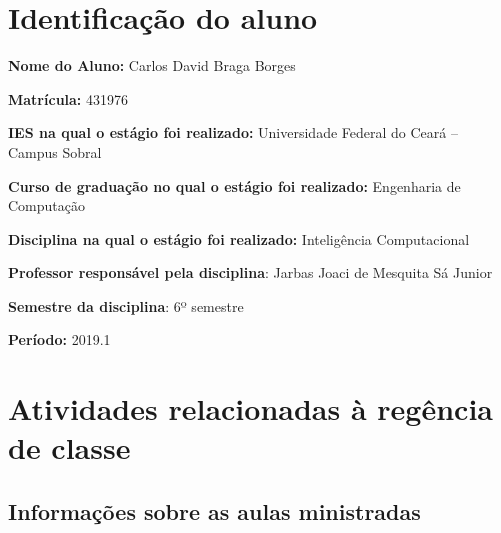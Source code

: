 \documentclass[
	12pt,				%
	openright,			%
	oneside,			%
	a4paper,			%
	chapter=TITLE,		%
	section=TITLE,		%
	english,			%
	french,				%
	spanish,			%
	brazil				%
	]{abntex2}
\begin{document}
\tableofcontents

\pagestyle{plain}

\chapter{Identificação do aluno}

\textbf{Nome do Aluno:} Carlos David Braga Borges

\textbf{Matrícula:} 431976

\textbf{IES na qual o estágio foi realizado:} Universidade Federal do Ceará -- Campus Sobral

\textbf{Curso de graduação no qual o estágio foi realizado:} Engenharia de Computação

\textbf{Disciplina na qual o estágio foi realizado:} Inteligência Computacional

\textbf{Professor responsável pela disciplina}: Jarbas Joaci de Mesquita Sá Junior

\textbf{Semestre da disciplina}: 6º semestre

\textbf{Período:} 2019.1


\newpage

\chapter{Atividades relacionadas à regência de classe}

\vspace{-1cm}

\section{Informações sobre as aulas ministradas}

\newcommand{\tabitem}{~~\llap{\textbullet}~~}
\end{document}
